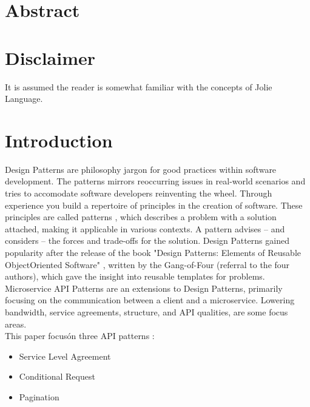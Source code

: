 \documentclass[12pt]{article}
\begin{document}

\tableofcontents
\newpage


\section{Abstract}

\section{Disclaimer}
It is assumed the reader is somewhat familiar with the concepts of Jolie Language. 

\newpage

\section{Introduction}
Design Patterns are philosophy jargon for good practices within software development. The patterns mirrors reoccurring issues in real-world scenarios and tries to accomodate software developers reinventing the wheel. Through experience you build a repertoire of principles in the creation of software. These principles are called patterns \cite{Applying_Patterns:1}, which describes a problem with a solution attached, making it applicable in various contexts. A pattern advises -- and considers -- the forces and trade-offs for the solution. Design Patterns gained popularity after the release of the book "Design Patterns: Elements of Reusable Object\-Oriented Software" \cite{DesignPGoF:1}, written by the Gang-of-Four (referral to the four authors), which gave the insight into reusable templates for problems. Microservice API Patterns are an extensions to Design Patterns, primarily focusing on the communication between a client and a microservice. Lowering bandwidth, service agreements, structure, and API qualities, are some focus areas. \\
This paper focus\' on three API patterns \cite{MAPIPweb:1}: 

\begin{itemize}
    \item Service Level Agreement
    \item Conditional Request
    \item Pagination
\end{itemize}
\end{document}
